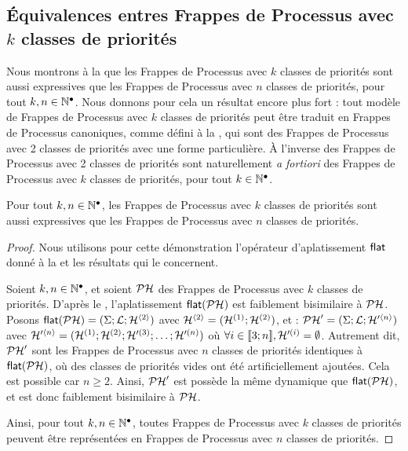 \subsection{Équivalences entres Frappes de Processus avec $k$ classes de priorités}

Nous montrons à la  que les Frappes de Processus avec $k$ classes
de priorités sont aussi expressives que les Frappes de Processus avec $n$ classes de
priorités, pour tout $k, n \in \mathbb{N}^\bullet$.
Nous donnons pour cela un résultat encore plus fort : tout modèle de Frappes de Processus avec $k$
classes de priorités peut être traduit en Frappes de Processus canoniques,
comme défini à la ,
qui sont des Frappes de Processus avec 2 classes de priorités
avec une forme particulière.
À l'inverse des Frappes de Processus avec 2 classes de priorités sont
naturellement \textit{a fortiori}
des Frappes de Processus avec $k$ classes de priorités, pour tout $k \in \mathbb{N}^\bullet$.

\begin{theorem}
  Pour tout $k, n \in \mathbb{N}^\bullet$, les Frappes de Processus avec $k$ classes de priorités
  sont aussi expressives que les Frappes de Processus avec $n$ classes de priorités.
\end{theorem}

\begin{proof}
  Nous utilisons pour cette démonstration
  l'opérateur d'aplatissement $\mathsf{flat}$ donné à la 
  et les résultats qui le concernent.
  
  Soient $k, n \in \mathbb{N}^\bullet$,
  et soient $\mathcal{PH}$ des Frappes de Processus avec $k$ classes de priorités.
  D'après le ,
  l'aplatissement $\mathsf{flat}(\mathcal{PH})$ est faiblement bisimilaire à $\mathcal{PH}$.
  Posons $\mathsf{flat}(\mathcal{PH}) = (\Sigma; \mathcal{L}; \mathcal{H}^{{\langle 2 \rangle}})$
  avec $\mathcal{H}^{{\langle 2 \rangle}} = (\mathcal{H}^{(1)}; \mathcal{H}^{(2)})$,
  et : $\mathcal{PH}' = (\Sigma; \mathcal{L}; \mathcal{H}'^{{\langle n \rangle}})$
  avec $\mathcal{H}'^{{\langle n \rangle}} = (\mathcal{H}^{(1)}; \mathcal{H}^{(2)}; \mathcal{H}'^{(3)}; \ldots; \mathcal{H}'^{(n)})$
  où $\forall i \in \llbracket 3; n \rrbracket, \mathcal{H}'^{(i)} = \emptyset$.
  Autrement dit, $\mathcal{PH}'$ sont les Frappes de Processus avec $n$ classes de priorités
  identiques à $\mathsf{flat}(\mathcal{PH})$, où des classes de priorités vides ont été
  artificiellement ajoutées.
  Cela est possible car $n \geq 2$.
  Ainsi, $\mathcal{PH}'$ est possède la même dynamique que $\mathsf{flat}(\mathcal{PH})$,
  et est donc faiblement bisimilaire à $\mathcal{PH}$.
  
  Ainsi, pour tout $k, n \in \mathbb{N}^\bullet$,
  toutes Frappes de Processus avec $k$ classes de priorités peuvent être représentées
  en Frappes de Processus avec $n$ classes de priorités.
\end{proof}



